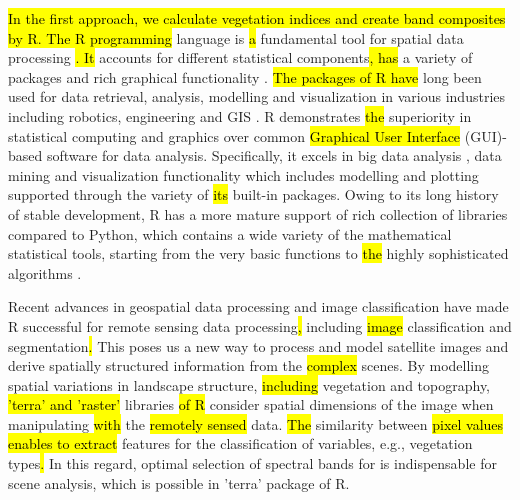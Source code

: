 \documentclass[jimaging,article,submit,pdftex,moreauthors]{Definitions/mdpi}
\begin{document}
\hl{In the first approach, we calculate vegetation indices and create band composites by R. The R programming }language is \hl{a} fundamental tool for spatial data processing \cite{RCoreTeam}\hl{. It} accounts for different statistical components\hl{, has} a variety of \hl{ }packages and rich graphical functionality \cite{Murrell}. \hl{The packages of R have} long been used for data retrieval, analysis, modelling and visualization in various industries including robotics, engineering and GIS \cite{7847824,Lemenkova2022a,9378399,Lemenkova202216,9390011}. R demonstrates \hl{the} superiority in statistical computing and graphics over common \hl{Graphical User Interface} (GUI)-based software for data analysis. Specifically, it excels in big data analysis \cite{7570960,9752002,6597171}, data mining \cite{7978404} and visualization functionality \cite{Lemenkova201991} which includes modelling and plotting supported through the variety of \hl{its} built-in packages. Owing to its long history of stable development, R has a more mature support of rich collection of libraries compared to Python, which contains a wide variety of the mathematical statistical tools, starting from the very basic functions to \hl{the} highly sophisticated algorithms \cite{9675988}. 

Recent advances in geospatial data processing \cite{8226275} and image classification \cite{9844952,8117873} have made R successful for remote sensing data processing\hl{,} including \hl{image} classification and segmentation\hl{. }This poses us a new way to process and model satellite images and derive spatially structured information from the \hl{complex }scenes. By modelling\hl{ }spatial variations in\hl{ }landscape structure, \hl{including} vegetation and topography,\hl{ 'terra' and 'raster' }libraries \hl{of R} consider spatial dimensions of the image when manipulating\hl{ with} the \hl{remotely sensed} data. \hl{The }similarity between \hl{pixel values enables to extract} features\hl{ }for the classification of variables, e.g., vegetation types\hl{. }In this regard, optimal selection of spectral bands for \hl{ }is indispensable for scene analysis, which is possible in 'terra' package of R.
\end{document}
